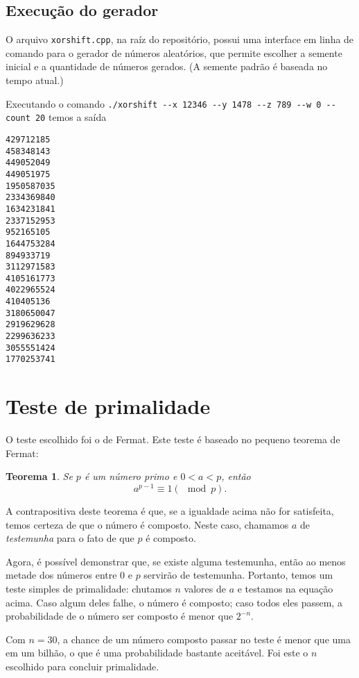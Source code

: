 \documentclass{article}
\newtheorem{theorem}{Teorema}
\begin{document}
\subsection{Execução do gerador}

O arquivo \verb"xorshift.cpp", na raíz do repositório,
possui uma interface em linha de comando para o gerador de números aleatórios,
que permite escolher a semente inicial e a quantidade de números gerados.
(A semente padrão é baseada no tempo atual.)

Executando o comando \verb"./xorshift --x 12346 --y 1478 --z 789 --w 0 --count 20"
temos a saída
\begin{verbatim}
429712185
458348143
449052049
449051975
1950587035
2334369840
1634231841
2337152953
952165105
1644753284
894933719
3112971583
4105161773
4022965524
410405136
3180650047
2919629628
2299636233
3055551424
1770253741
\end{verbatim}

\section{Teste de primalidade}

O teste escolhido foi o de Fermat.
Este teste é baseado no pequeno teorema de Fermat:
\begin{theorem}
    Se $p$ é um número primo e $0 < a < p$, então
    \begin{equation*}
        a^{p-1} \equiv 1 (\mod p).
    \end{equation*}
\end{theorem}
A contrapositiva deste teorema é que,
se a igualdade acima não for satisfeita,
temos certeza de que o número é composto.
Neste caso,
chamamos $a$ de \emph{testemunha} para o fato de que $p$ é composto.

Agora, é possível demonstrar que,
se existe alguma testemunha,
então ao menos metade dos números entre $0$ e $p$ servirão de testemunha.
Portanto, temos um teste simples de primalidade:
chutamos $n$ valores de $a$ e testamos na equação acima.
Caso algum deles falhe,
o número é composto;
caso todos eles passem,
a probabilidade de o número ser composto é menor que $2^{-n}$.

Com $n = 30$, a chance de um número composto passar no teste
é menor que uma em um bilhão,
o que é uma probabilidade bastante aceitável.
Foi este o $n$ escolhido para concluir primalidade.
\end{document}
